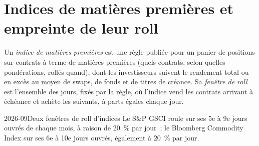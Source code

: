 \begin{omfigure}

\label{fig:m3:forward-curves-storage-and-convenience-yield:samuelson}
\end{omfigure}

\section{Indices de matières premières et empreinte de leur roll}

\begin{definition}\label{def:m3:forward-curves-storage-and-convenience-yield:index}
Un \emph{indice de matières premières} est une règle publiée pour un panier de positions sur
contrats à terme de matières premières (quels contrats, selon quelles pondérations, rollés quand), dont les investisseurs suivent
le rendement total ou en excès au moyen de swaps, de fonds et de titres de créance. Sa \emph{fenêtre de roll}
est l'ensemble des jours, fixés par la règle, où l'indice vend les contrats arrivant à échéance et achète les suivants, à parts
égales chaque jour.
\end{definition}

\begin{dated}{2026-09}{Deux fenêtres de roll d'indices}\label{dat:m3:forward-curves-storage-and-convenience-yield:windows}
Le S\&P GSCI roule sur ses 5e à 9e jours ouvrés de chaque mois, à raison de 20~\% par jour~; le
Bloomberg Commodity Index sur ses 6e à 10e jours ouvrés, également à 20~\% par jour.
\end{dated}

